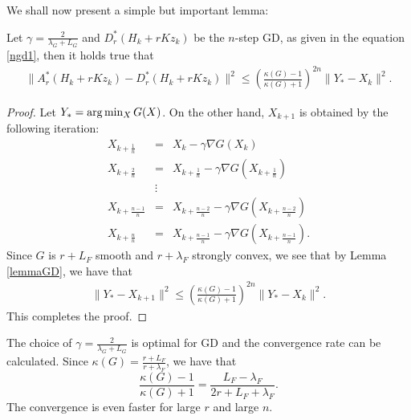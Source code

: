 We shall now present a simple but important lemma: 
\begin{lemma}\label{main:lm} 
Let $\gamma = \frac{2}{\lambda_{G} + L_{G}}$ and $D_r^*(H_k + rKz_k)$ be the $n$-step GD, as given in the equation \eqref{ngd1}, then it holds true that 
\begin{eqnarray*}
\|A_r^*(H_k + rKz_k) - D_r^*(H_k + rKz_k)\|^2 \leq  \left ( \frac{\kappa(G) - 1}{\kappa(G) + 1} \right )^{2n} \|Y_* - X_k\|^2. 
\end{eqnarray*}
\end{lemma}
\begin{proof}
Let $Y_* = {\rm arg} \min_{X} G(X)$. On the other hand, $X_{k+1}$ is obtained by the following iteration: 
\begin{eqnarray*} 
X_{k+\frac{1}{n}} &=& X_{k} - \gamma \nabla G(X_k) \\
X_{k+\frac{2}{n}} &=& X_{k+\frac{1}{n}} - \gamma \nabla G(X_{k+\frac{1}{n}}) \\ 
&\vdots& \\  
X_{k+\frac{n-1}{n}} &=& X_{k+\frac{n-2}{n}} - \gamma \nabla G(X_{k + \frac{n-2}{n}}) \\
X_{k+\frac{n}{n}} &=& 
X_{k+\frac{n-1}{n}} - \gamma \nabla G(X_{k+\frac{n-1}{n}}).  
\end{eqnarray*}
Since $G$ is $r+L_F$ smooth and $r+\lambda_F$ strongly convex, we see that by Lemma \ref{lemmaGD}, we have that 
\begin{eqnarray*}
\|Y_* - X_{k+1}\|^2 \leq \left ( \frac{\kappa(G)-1}{\kappa(G)+1} \right )^{2n} \|Y_* - X_k\|^2. 
\end{eqnarray*}
%
This completes the proof. 
\end{proof}
\begin{remark} 
The choice of $\gamma = \frac{2}{\lambda_{G} + L_{G}}$ is optimal for GD and the convergence rate can be calculated. Since $\kappa(G) = \frac{r + L_F}{r + \lambda_F}$, we have that 
\begin{equation}
\frac{\kappa(G)-1}{\kappa(G)+1} = \frac{L_F - \lambda_F}{2r + L_F + \lambda_F}. 
\end{equation}
The convergence is even faster for large $r$ and large $n$.
\end{remark}
